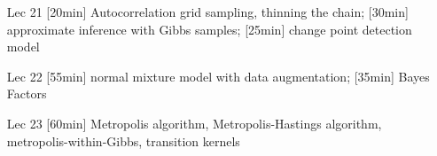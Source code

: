 \begin{enumerate}
\item[Lec 21] [20min] Autocorrelation grid sampling, thinning the chain; [30min] approximate inference with Gibbs samples; [25min] change point detection model

\item[Lec 22] [55min] normal mixture model with data augmentation; [35min] Bayes Factors

\item[Lec 23] [60min] Metropolis algorithm, Metropolis-Hastings algorithm, metropolis-within-Gibbs, transition kernels


\end{enumerate}